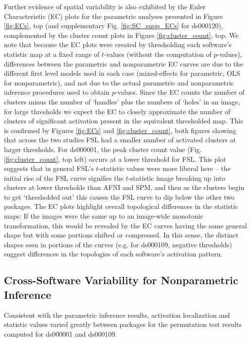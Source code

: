 Further evidence of spatial variability is also exhibited by the Euler Characteristic (EC) plots for the parametric analyses presented in Figure \ref{fig:ECs}, top (and supplementary Fig. \ref{fig:SC_supp_ECs} for ds000120), complemented by the cluster count plots in Figure \ref{fig:cluster_count}, top. We note that because the EC plots were created by thresholding each software's statistic map at a fixed range of $t$-values (without the computation of $p$-values), differences between the parametric and nonparametric EC curves are due to the different first level models used in each case (mixed-effects for parametric, OLS for nonparametric), and not due to the actual parametric and nonparametric inference procedures used to obtain $p$-values. Since the EC counts the number of clusters minus the number of `handles' plus the numbers of `holes' in an image, for large thresholds we expect the EC to closely approximate the number of clusters of significant activation present in the equivalent thresholded map. This is confirmed by Figures \ref{fig:ECs} and \ref{fig:cluster_count}, both figures showing that across the two studies FSL had a smaller number of activated clusters at larger thresholds. For ds000001, the peak cluster count value (Fig. \ref{fig:cluster_count}, top left) occurs at a lower threshold for FSL. This plot suggests that in general FSL's $t$-statistic values were more liberal here -- the initial rise of the FSL curve signifies the $t$-statistic image breaking up into clusters at lower thresholds than AFNI and SPM, and then as the clusters begin to get `thresholded out' this causes the FSL curve to dip below the other two packages. The EC plots highlight overall topological differences in the statistic maps: If the images were the same up to an image-wide monotonic transformation, this would be revealed by the EC curves having the same general shape but with some portions shifted or compressed. In this sense, the distinct shapes seen in portions of the curves (e.g. for ds000109, negative thresholds) suggest differences in the topologies of each software's activation pattern. 

\subsection{Cross-Software Variability for Nonparametric Inference}

Consistent with the parametric inference results, activation localization and statistic values varied greatly between packages for the permutation test results computed for ds000001 and ds000109.

